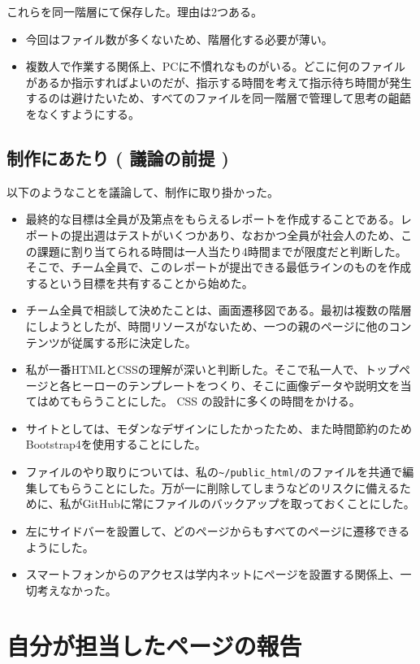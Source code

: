 \documentclass[12pt,a4j]{jarticle}
\begin{document}
これらを同一階層にて保存した。理由は2つある。

\begin{itemize}
  \item 今回はファイル数が多くないため、階層化する必要が薄い。
  \item 複数人で作業する関係上、PCに不慣れなものがいる。どこに何のファイルがあるか指示すればよいのだが、指示する時間を考えて指示待ち時間が発生するのは避けたいため、すべてのファイルを同一階層で管理して思考の齟齬をなくすようにする。
\end{itemize}

\subsection{制作にあたり ( 議論の前提 )}

以下のようなことを議論して、制作に取り掛かった。

\begin{itemize}
  \item 最終的な目標は全員が及第点をもらえるレポートを作成することである。レポートの提出週はテストがいくつかあり、なおかつ全員が社会人のため、この課題に割り当てられる時間は一人当たり4時間までが限度だと判断した。そこで、チーム全員で、このレポートが提出できる最低ラインのものを作成するという目標を共有することから始めた。
  \item チーム全員で相談して決めたことは、画面遷移図である。最初は複数の階層にしようとしたが、時間リソースがないため、一つの親のページに他のコンテンツが従属する形に決定した。
  \item 私が一番HTMLとCSSの理解が深いと判断した。そこで私一人で、トップページと各ヒーローのテンプレートをつくり、そこに画像データや説明文を当てはめてもらうことにした。
 CSS の設計に多くの時間をかける。
  \item サイトとしては、モダンなデザインにしたかったため、また時間節約のためBootstrap4を使用することにした。
  \item ファイルのやり取りについては、私の\verb|~/public_html/|のファイルを共通で編集してもらうことにした。万が一に削除してしまうなどのリスクに備えるために、私がGitHubに常にファイルのバックアップを取っておくことにした。
  \item 左にサイドバーを設置して、どのページからもすべてのページに遷移できるようにした。
  \item スマートフォンからのアクセスは学内ネットにページを設置する関係上、一切考えなかった。
\end{itemize}

\section{自分が担当したページの報告}
\end{document}
